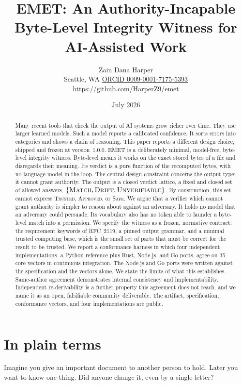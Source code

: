 \documentclass[11pt]{article}
\title{\textbf{EMET: An Authority-Incapable Byte-Level Integrity Witness for AI-Assisted Work}}
\author{Zain Dana Harper\\[2pt]\small Seattle, WA \quad\textbar\quad \href{https://orcid.org/0009-0001-7175-5393}{ORCID 0009-0001-7175-5393}\\[2pt]\small\url{https://github.com/HarperZ9/emet}}
\date{July 2026}
\begin{document}
\maketitle

\begin{abstract}
Many recent tools that check the output of AI systems grow richer over time. They use larger learned models. Such a model reports a calibrated confidence. It sorts errors into categories and shows a chain of reasoning. This paper reports a different design choice, shipped and frozen at version~1.0.0. EMET is a deliberately minimal, model-free, byte-level integrity witness. Byte-level means it works on the exact stored bytes of a file and disregards their meaning. Its verdict is a pure function of the recomputed bytes, with no language model in the loop. The central design constraint concerns the output type: it cannot grant authority. The output is a closed verdict lattice, a fixed and closed set of allowed answers, $\{\textsc{Match}, \textsc{Drift}, \textsc{Unverifiable}\}$. By construction, this set cannot express \textsc{Trusted}, \textsc{Approved}, or \textsc{Safe}. We argue that a verifier which cannot grant authority is simpler to reason about against an adversary. It holds no model that an adversary could persuade. Its vocabulary also has no token able to launder a byte-level match into a permission. We specify the witness as a frozen, normative contract: the requirement keywords of RFC~2119, a pinned output grammar, and a minimal trusted computing base, which is the small set of parts that must be correct for the result to be trusted. We report a conformance harness in which four independent implementations, a Python reference plus Rust, Node.js, and Go ports, agree on 35 core vectors in continuous integration. The Node.js and Go ports were written against the specification and the vectors alone. We state the limits of what this establishes. Same-author agreement demonstrates internal consistency and implementability. Independent re-derivability is a further property this agreement does not reach, and we name it as an open, falsifiable community deliverable. The artifact, specification, conformance vectors, and four implementations are public.
\end{abstract}

\section*{In plain terms}

Imagine you give an important document to another person to hold. Later you want to know one thing. Did anyone change it, even by a single letter?
\end{document}
